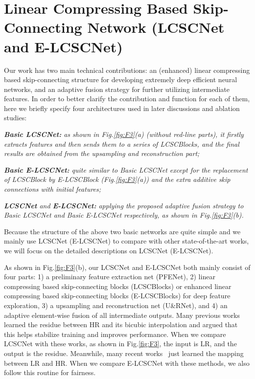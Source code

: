 \documentclass[journal]{IEEEtran}
\begin{document}
\section{Linear Compressing Based Skip-Connecting Network (LCSCNet and E-LCSCNet)}\label{s:s_3}

Our work has two main technical contributions: an (enhanced) linear compressing based skip-connecting structure for developing extremely deep efficient neural networks, and an adaptive fusion strategy for further utilizing intermediate features. In order to better clarify the contribution and function for each of them, here we briefly specify four architectures used in later discussions and ablation studies: 

\emph{\textbf{Basic LCSCNet:} as shown in Fig.\ref{fig:F3}(a) (without red-line parts), it firstly extracts features and then sends them to a series of LCSCBlocks, and the final results are obtained from the upsampling and reconstruction part;}

\emph{\textbf{Basic E-LCSCNet:} quite similar to Basic LCSCNet except for the replacement of LCSCBlock by E-LCSCBlock (Fig.\ref{fig:F3}(a)) and the extra additive skip connections with initial features;}

\emph{\textbf{LCSCNet} and \textbf{E-LCSCNet:} applying the proposed adaptive fusion strategy to Basic LCSCNet and Basic E-LCSCNet respectively, as shown in Fig.\ref{fig:F3}(b).} 

Because the structure of the above two basic networks are quite simple and we mainly use LCSCNet (E-LCSCNet) to compare with other state-of-the-art works, we will focus on the detailed descriptions on LCSCNet (E-LCSCNet).


As shown in Fig.\ref{fig:F3}(b), our LCSCNet and E-LCSCNet both mainly consist of four parts: 1) a preliminary feature extraction net (PFENet), 2) linear compressing based skip-connecting blocks (LCSCBlocks) or enhanced linear compressing based skip-connecting blocks (E-LCSCBlocks) for deep feature exploration, 3) a upsampling and reconstruction net (U\&RNet), and 4) an adaptive element-wise fusion of all intermediate outputs. Many previous works~\cite{kim2016accurate, tai2017image, Tai-MemNet-2017, LapSRN} learned the residue between HR and its bicubic interpolation and argued that this helps stabilize training and improves performance. When we compare LCSCNet with these works, as shown in Fig.\ref{fig:F3}, the input  is LR, and the output  is the residue. Meanwhile, many recent works~\cite{lim2017enhanced, zhang2018residual} just learned the mapping between LR and HR. When we compare E-LCSCNet with these methods, we also follow this routine for fairness. 
\end{document}
